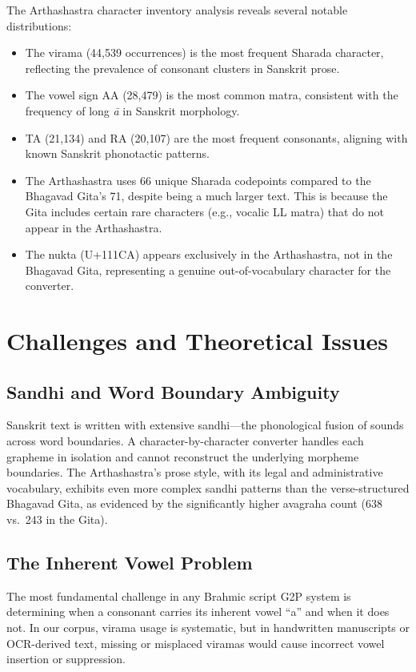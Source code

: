 \documentclass[11pt]{article}
\begin{document}
The Arthashastra character inventory analysis reveals several notable distributions:
\begin{itemize}
    \item The virama (44,539 occurrences) is the most frequent Sharada character, reflecting the prevalence of consonant clusters in Sanskrit prose.
    \item The vowel sign AA (28,479) is the most common matra, consistent with the frequency of long \textit{\={a}} in Sanskrit morphology.
    \item TA (21,134) and RA (20,107) are the most frequent consonants, aligning with known Sanskrit phonotactic patterns.
    \item The Arthashastra uses 66 unique Sharada codepoints compared to the Bhagavad Gita's 71, despite being a much larger text. This is because the Gita includes certain rare characters (e.g., vocalic LL matra) that do not appear in the Arthashastra.
    \item The nukta (U+111CA) appears exclusively in the Arthashastra, not in the Bhagavad Gita, representing a genuine out-of-vocabulary character for the converter.
\end{itemize}

\section{Challenges and Theoretical Issues}

\subsection{Sandhi and Word Boundary Ambiguity}
Sanskrit text is written with extensive sandhi---the phonological fusion of sounds across word boundaries. A character-by-character converter handles each grapheme in isolation and cannot reconstruct the underlying morpheme boundaries. The Arthashastra's prose style, with its legal and administrative vocabulary, exhibits even more complex sandhi patterns than the verse-structured Bhagavad Gita, as evidenced by the significantly higher avagraha count (638 vs.\ 243 in the Gita).

\subsection{The Inherent Vowel Problem}
The most fundamental challenge in any Brahmic script G2P system is determining when a consonant carries its inherent vowel ``a'' and when it does not. In our corpus, virama usage is systematic, but in handwritten manuscripts or OCR-derived text, missing or misplaced viramas would cause incorrect vowel insertion or suppression.
\end{document}
